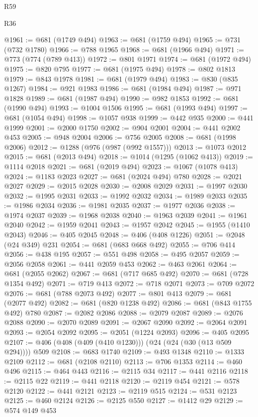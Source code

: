 \begin{lexlean}{R59}
\begin{lexlean}{R36}
\begin{coremodule}
{{{{{{{{{{{{{{{{{{{{{{{{{{{{{{{{{{{{{{{{{{{{{{{{{{{{{{{{{{{{{{{{{{{{{{{{{{{{{{{{{{@1961 := @681 (@1749 @494)
@1963 := @681 (@1759 @494)
@1965 := @731 (@732 @1780)
@1966 := @788 @1965
@1968 := @681 (@1966 @494)
@1971 := @773 (@774 (@789 @413))
@1972 := @801 @1971
@1974 := @681 (@1972 @494)
@1975 := @820 @795
@1977 := @681 (@1975 @494)
@1978 := @802 @1813
@1979 := @843 @1978
@1981 := @681 (@1979 @494)
@1983 := @830 (@835 @1267)
@1984 := @921 @1983
@1986 := @681 (@1984 @494)
@1987 := @971 @1828
@1989 := @681 (@1987 @494)
@1990 := @982 @1853
@1992 := @681 (@1990 @494)
@1993 := @1004 @1506
@1995 := @681 (@1993 @494)
@1997 := @681 (@1054 @494)
@1998 := @1057 @938
@1999 := @442 @935
@2000 := @441 @1999
@2001 := @2000 @1750
@2002 := @904 @2001
@2004 := @441 @2002 @453
@2005 := @948 @2004
@2006 := @756 @2005
@2008 := @681 (@1998 @2006)
@2012 := @1288 (@976 (@987 (@992 @1557)))
@2013 := @1073 @2012
@2015 := @681 (@2013 @494)
@2018 := @1014 (@1295 (@1062 @413))
@2019 := @1114 @2018
@2021 := @681 (@2019 @494)
@2023 := @1067 (@1078 @413)
@2024 := @1183 @2023
@2027 := @681 (@2024 @494) @780
@2028 := @2021 @2027
@2029 := @2015 @2028
@2030 := @2008 @2029
@2031 := @1997 @2030
@2032 := @1995 @2031
@2033 := @1992 @2032
@2034 := @1989 @2033
@2035 := @1986 @2034
@2036 := @1981 @2035
@2037 := @1977 @2036
@2038 := @1974 @2037
@2039 := @1968 @2038
@2040 := @1963 @2039
@2041 := @1961 @2040
@2042 := @1959 @2041
@2043 := @1957 @2042
@2045 := @1955 (@1410 @2043)
@2046 := @405 @2045
@2048 := @406 (@408 @1226)
@2051 := @2048 (@24 @349) @231
@2054 := @681 (@683 @668 @492)
@2055 := @706 @414
@2056 := @438 @195
@2057 := @551 @498
@2058 := @495 @2057
@2059 := @2056 @2058
@2061 := @441 @2059 @453
@2062 := @463 @2061
@2064 := @681 (@2055 @2062)
@2067 := @681 (@717 @685 @492)
@2070 := @681 (@728 @1354 @492)
@2071 := @719 @413
@2072 := @718 @2071
@2073 := @709 @2072
@2076 := @681 (@788 @2073 @492)
@2077 := @801 @413
@2079 := @681 (@2077 @492)
@2082 := @681 (@820 @1238 @492)
@2086 := @681 (@843 @1755 @492) @780
@2087 := @2082 @2086
@2088 := @2079 @2087
@2089 := @2076 @2088
@2090 := @2070 @2089
@2091 := @2067 @2090
@2092 := @2064 @2091
@2093 := @2054 @2092
@2095 := @2051 (@1224 @2093)
@2096 := @405 @2095
@2107 := @406 (@408 (@409 (@410 @1230))) (@24 (@24 (@30 (@13 @509 @294)))) @509
@2108 := @683 @1740
@2109 := @493 @1348
@2110 := @1333 @2109
@2112 := @681 (@2108 @2110)
@2113 := @706 @1353
@2114 := @460 @496
@2115 := @464 @443
@2116 := @2115 @34
@2117 := @441 @2116
@2118 := @2115 @22
@2119 := @441 @2118
@2120 := @2119 @454
@2121 := @578 @2120
@2122 := @441 @2121
@2123 := @2119 @515
@2124 := @531 @2123
@2125 := @460 @2124
@2126 := @2125 @550
@2127 := @1412 @29
@2129 := @574 @149 @453
}}}}}}}}}}}}}}}}}}}}}}}}}}}}}}}}}}}}}}}}}}}}}}}}}}}}}}}}}}}}}}}}}}}}}}}}}}}}}}}}}}
\end{coremodule}
\end{lexlean}
\end{lexlean}
